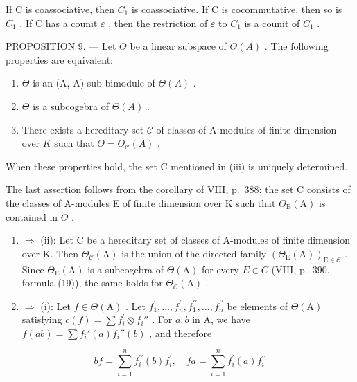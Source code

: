 If C is coassociative, then \(C_{1}\) is coassociative. If C is cocommutative, then so is \(C_{1}\) . If C has a counit \(\varepsilon\) , then the restriction of \(\varepsilon\) to \(C_{1}\) is a counit of \(C_{1}\) .

PROPOSITION 9. --- Let \(\Theta\) be a linear subspace of \(\Theta(A)\) . The following properties are equivalent:

\begin{enumerate}
\def\labelenumi{(\roman{enumi})}
\item
  \(\Theta\) is an (A, A)-sub-bimodule of \(\Theta(A)\) .
\item
  \(\Theta\) is a subcogebra of \(\Theta(A)\) .
\item
  There exists a hereditary set \(\mathcal{C}\) of classes of A-modules of finite dimension over \(K\) such that \(\Theta = \Theta_{\mathcal{C}}(A)\) .
\end{enumerate}

When these properties hold, the set C mentioned in (iii) is uniquely determined.

The last assertion follows from the corollary of VIII, p.~388: the set C consists of the classes of A-modules E of finite dimension over K such that \(\Theta_{\mathrm{E}}(\mathrm{A})\) is contained in \(\Theta\) .

\begin{enumerate}
\def\labelenumi{(\roman{enumi})}
\setcounter{enumi}{2}
\item
  \(\Rightarrow\) (ii): Let C be a hereditary set of classes of A-modules of finite dimension over K. Then \(\Theta_{\mathcal{C}}(\mathrm{A})\) is the union of the directed family \((\Theta_{\mathrm{E}}(\mathrm{A}))_{\mathrm{E}\in\mathcal{C}}\) . Since \(\Theta_{\mathrm{E}}(\mathrm{A})\) is a subcogebra of \(\Theta(\mathrm{A})\) for every \(E\in C\) (VIII, p.~390, formula (19)), the same holds for \(\Theta_{\mathcal{C}}(\mathrm{A})\) .
\item
  \(\Rightarrow\) (i): Let \(f\in \Theta (\mathrm{A})\) . Let \(f_{1}^{\prime},\ldots ,f_{n}^{\prime},f_{1}^{\prime \prime},\ldots ,f_{n}^{\prime \prime}\) be elements of \(\Theta (\mathrm{A})\) satisfying \(c(f) = \sum f_i^\prime \otimes f_i''\) . For \(a,b\) in A, we have \(f(ab) = \sum f_i'(a)f_i''(b)\) , and therefore
\end{enumerate}

\[
b f = \sum_ {i = 1} ^ {n} f _ {i} ^ {\prime \prime} (b) f _ {i} ^ {\prime}, \quad f a = \sum_ {i = 1} ^ {n} f _ {i} ^ {\prime} (a) f _ {i} ^ {\prime \prime}
\]

